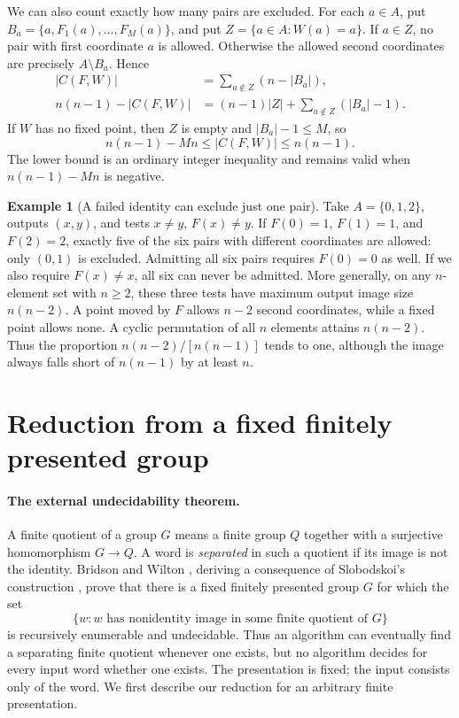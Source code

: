\documentclass[12pt]{article}
\theoremstyle{definition}
\newtheorem{example}[theorem]{Example}
\begin{document}
We can also count exactly how many pairs are excluded. For each $a\in A$,
put $B_a=\{a,F_1(a),\ldots,F_M(a)\}$, and put
$Z=\{a\in A:W(a)=a\}$. If $a\in Z$, no pair with first coordinate
$a$ is allowed. Otherwise the allowed second coordinates are precisely
$A\setminus B_a$. Hence
\begin{align}
 |C(F,W)|&=\sum_{a\notin Z}(n-|B_a|),\label{eq:count}\\
 n(n-1)-|C(F,W)|&=(n-1)|Z|+
                  \sum_{a\notin Z}(|B_a|-1).\label{eq:defect}
\end{align}
If $W$ has no fixed point, then $Z$ is empty and $|B_a|-1\le M$, so
\begin{equation}\label{eq:densitybound}
 n(n-1)-Mn\le |C(F,W)|\le n(n-1).
\end{equation}
The lower bound is an ordinary integer inequality and remains valid
when $n(n-1)-Mn$ is negative.

\begin{example}[A failed identity can exclude just one pair]
Take $A=\{0,1,2\}$, outputs $(x,y)$, and tests $x\ne y$, $F(x)\ne y$.
If $F(0)=1$, $F(1)=1$, and $F(2)=2$, exactly five of the six pairs with
different coordinates are allowed: only $(0,1)$ is excluded. Admitting
all six pairs requires $F(0)=0$ as well.
If we also require $F(x)\ne x$, all six can never be admitted.
More generally, on any $n$-element set with $n\ge2$, these three tests
have maximum output image size $n(n-2)$. A point moved by $F$ allows
$n-2$ second coordinates, while a fixed point allows none. A cyclic
permutation of all $n$ elements attains $n(n-2)$.
Thus the proportion $n(n-2)/[n(n-1)]$ tends to one, although the image
always falls short of $n(n-1)$ by at least $n$.
\end{example}

\section{Reduction from a fixed finitely presented group}\label{sec:reduction}

\paragraph{The external undecidability theorem.}
A finite quotient of a group $G$ means a finite group $Q$ together with
a surjective homomorphism $G\to Q$. A word is \emph{separated} in such
a quotient if its image is not the identity. Bridson and Wilton
\cite[Theorem 2.1]{BW}, deriving a consequence of Slobodskoi's construction
\cite{Slo}, prove that there is a fixed finitely presented group $G$
for which the set
\[
 \{w:\text{$w$ has nonidentity image in some finite quotient of $G$}\}
\]
is recursively enumerable and undecidable. Thus an algorithm can
eventually find a separating finite quotient whenever one exists,
but no algorithm decides for every input word whether one exists.
The presentation is fixed; the input consists only of the word.
We first describe our reduction for an arbitrary finite presentation.
\end{document}
